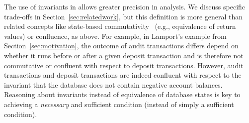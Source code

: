 The use of invariants in \iconfluence allows greater precision in
analysis. We discuss specific trade-offs in
Section~\ref{sec:relatedwork}, but this definition is more general
than related concepts like state-based
commutativity~\cite{weihl-thesis} (e.g., equivalence of return values)
or confluence, as above. For example, in Lamport's example from
Section~\ref{sec:motivation}, the outcome of audit transactions
differs depend on whether it runs before or after a given deposit
transaction and is therefore not commutative or confluent with respect
to deposit transactions. However, audit transactions and deposit
transactions are indeed confluent with respect to the invariant that
the database does not contain negative account balances. Reasoning
about invariants instead of equivalence of database states is key to
achieving a \textit{necessary} and sufficient condition (instead of
simply a sufficient condition).

